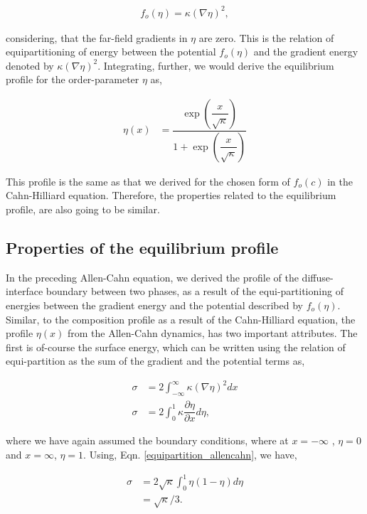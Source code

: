 \documentclass[english]{iambook}
\begin{document}
\begin{align}
 f_o\left(\eta\right) = \kappa\left(\nabla \eta\right)^{2},
 \label{equipartition_allencahn}
\end{align}

considering, that the far-field gradients in $\eta$ are zero. This is 
the relation of equipartitioning of energy between the potential 
$f_o\left(\eta\right)$ and the gradient energy denoted by 
$\kappa\left(\nabla \eta\right)^{2}$. Integrating, further, we 
would derive the equilibrium profile for the order-parameter
$\eta$ as,

\begin{align}
 \eta\left(x\right) &= \dfrac{\exp\left(\dfrac{x}{\sqrt{\kappa}}\right)}{1 + \exp\left(\dfrac{x}{\sqrt{\kappa}}\right)}
\end{align}

This profile is the same as that we derived for the chosen form 
of $f_o\left(c\right)$ in the Cahn-Hilliard equation. Therefore, 
the properties related to the equilibrium profile, are also going
to be similar. 

\subsection{Properties of the equilibrium profile}
In the preceding Allen-Cahn equation, we derived the
profile of the diffuse-interface boundary between two 
phases, as a result of the equi-partitioning of energies
between the gradient energy and the potential described
by $f_o\left(\eta\right)$. Similar, to the composition 
profile as a result of the Cahn-Hilliard equation, the
profile $\eta\left(x\right)$ from the Allen-Cahn dynamics,  
has two important attributes. The first is of-course the 
surface energy, which can be written using the relation of
equi-partition as the sum of the gradient and the potential 
terms as, 

\begin{align}
 \sigma &= 2\int_{-\infty}^{\infty}\kappa\left(\nabla \eta\right)^{2} dx\\
 \sigma &= 2\int_{0}^{1}\kappa\dfrac{\partial \eta}{\partial x}d \eta,
\end{align}

where we have again assumed the boundary conditions, where 
at $x=-\infty$ , $\eta=0$ and $x=\infty$, $\eta=1$. Using, 
Eqn. \ref{equipartition_allencahn},  we have,

\begin{align}
 \sigma &= 2\sqrt{\kappa}\int_{0}^{1}\eta\left(1-\eta\right)d \eta\\
        &= \sqrt{\kappa}/3.
\end{align}
\end{document}
